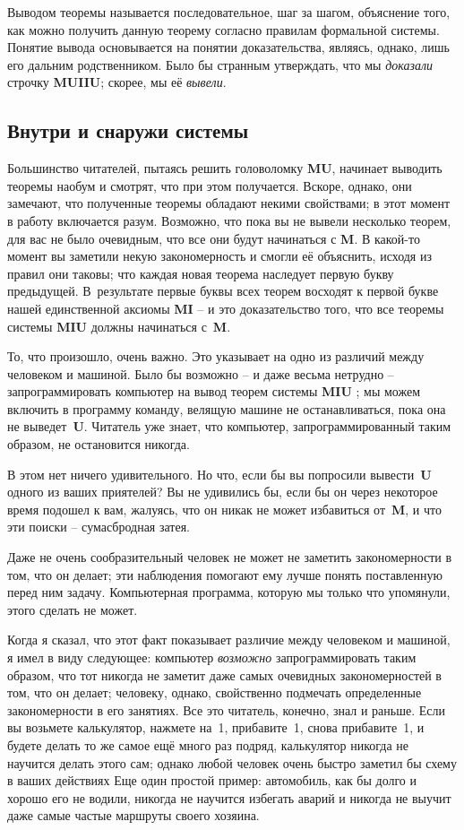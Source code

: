 \documentclass[../main.tex]{subfiles}
\begin{document}
Выводом теоремы называется последовательное, шаг за шагом, объяснение того, как можно получить данную теорему согласно правилам формальной системы.
Понятие вывода основывается на понятии доказательства, являясь, однако, лишь его дальним родственником.
Было бы странным утверждать, что мы \emph{доказали} строчку \textbf{MUIIU}; скорее, мы её \emph{вывели}.


\subsection{Внутри и снаружи системы}

Большинство читателей, пытаясь решить головоломку \textbf{MU}, начинает выводить теоремы наобум и смотрят, что при этом получается. Вскоре, однако, они замечают, что полученные теоремы обладают некими свойствами; в этот момент в работу включается разум. Возможно, что пока вы не вывели несколько теорем, для вас не было очевидным, что все они будут начинаться с \textbf{M}. В какой-то момент вы заметили некую закономерность и смогли её объяснить, исходя из правил они таковы; что каждая новая теорема наследует первую букву предыдущей. В~результате первые буквы всех теорем восходят к первой букве нашей единственной аксиомы \textbf{MI} \--- и это доказательство того, что все теоремы системы \textbf{MIU} должны начинаться с~\textbf{M}.

То, что произошло, очень важно. Это указывает на одно из различий между человеком и машиной. Было бы возможно \--- и даже весьма нетрудно \--- запрограммировать компьютер на вывод теорем системы \textbf{MIU} ; мы можем включить в программу команду, велящую машине не останавливаться, пока она не выведет~\textbf{U}. Читатель уже знает, что компьютер, запрограммированный таким образом, не остановится никогда.

В этом нет ничего удивительного. Но что, если бы вы попросили вывести~\textbf{U} одного из ваших приятелей? Вы не удивились бы, если бы он через некоторое время подошел к вам, жалуясь, что он никак не может избавиться от~\textbf{M}, и что эти поиски \--- сумасбродная затея.

Даже не очень сообразительный человек не может не заметить закономерности в том, что он делает; эти наблюдения помогают ему лучше понять поставленную перед ним задачу. Компьютерная программа, которую мы только что упомянули, этого сделать не может.

Когда я сказал, что этот факт показывает различие между человеком и машиной, я имел в виду следующее: компьютер \emph{возможно} запрограммировать таким образом, что тот никогда не заметит даже самых очевидных закономерностей в том, что он делает; человеку, однако, свойственно подмечать определенные закономерности в его занятиях. Все это читатель, конечно, знал и раньше. Если вы возьмете калькулятор, нажмете на~1, прибавите~1, снова прибавите~1, и будете делать то же самое ещё много раз подряд, калькулятор никогда не научится делать этого сам; однако любой человек очень быстро заметил бы схему в ваших действиях Еще один простой пример: автомобиль, как бы долго и хорошо его не водили, никогда не научится избегать аварий и никогда не выучит даже самые частые маршруты своего хозяина.
\end{document}

